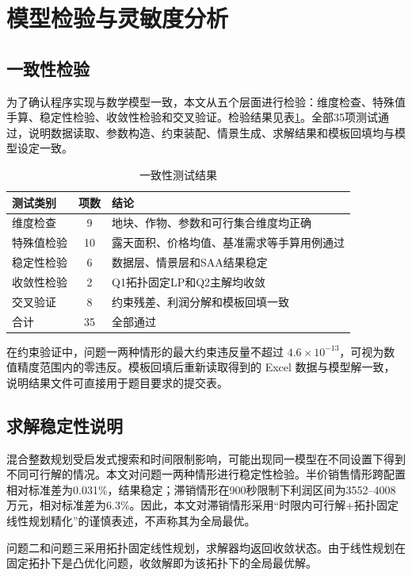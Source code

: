 \section{模型检验与灵敏度分析}

\subsection{一致性检验}

为了确认程序实现与数学模型一致，本文从五个层面进行检验：维度检查、特殊值手算、稳定性检验、收敛性检验和交叉验证。检验结果见表\ref{tab:test-summary}。全部35项测试通过，说明数据读取、参数构造、约束装配、情景生成、求解结果和模板回填均与模型设定一致。

\begin{table}[H]
\centering
\caption{一致性测试结果}
\label{tab:test-summary}
\begin{tabular}{lcl}
\toprule
测试类别 & 项数 & 结论 \\
\midrule
维度检查 & 9 & 地块、作物、参数和可行集合维度均正确 \\
特殊值检验 & 10 & 露天面积、价格均值、基准需求等手算用例通过 \\
稳定性检验 & 6 & 数据层、情景层和SAA结果稳定 \\
收敛性检验 & 2 & Q1拓扑固定LP和Q2主解均收敛 \\
交叉验证 & 8 & 约束残差、利润分解和模板回填一致 \\
\midrule
合计 & 35 & 全部通过 \\
\bottomrule
\end{tabular}
\end{table}

在约束验证中，问题一两种情形的最大约束违反量不超过 $4.6\times 10^{-13}$，可视为数值精度范围内的零违反。模板回填后重新读取得到的 Excel 数据与模型解一致，说明结果文件可直接用于题目要求的提交表。

\subsection{求解稳定性说明}

混合整数规划受启发式搜索和时间限制影响，可能出现同一模型在不同设置下得到不同可行解的情况。本文对问题一两种情形进行稳定性检验。半价销售情形跨配置相对标准差为0.031\%，结果稳定；滞销情形在900秒限制下利润区间为3552--4008万元，相对标准差为6.3\%。因此，本文对滞销情形采用“时限内可行解+拓扑固定线性规划精化”的谨慎表述，不声称其为全局最优。

问题二和问题三采用拓扑固定线性规划，求解器均返回收敛状态。由于线性规划在固定拓扑下是凸优化问题，收敛解即为该拓扑下的全局最优解。

